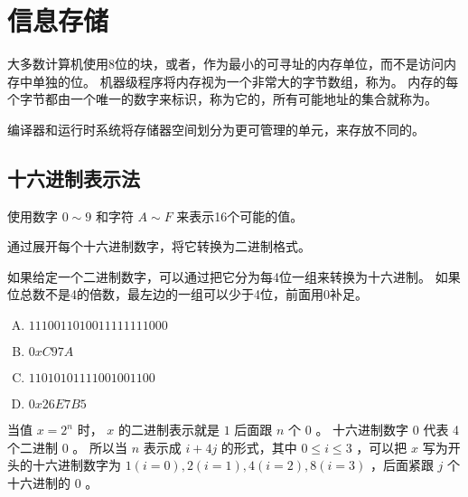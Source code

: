 
\section{信息存储}
{
    大多数计算机使用8位的块，或者，作为最小的可寻址的内存单位，而不是访问内存中单独的位。
    机器级程序将内存视为一个非常大的字节数组，称为。
    内存的每个字节都由一个唯一的数字来标识，称为它的，所有可能地址的集合就称为。

    编译器和运行时系统将存储器空间划分为更可管理的单元，来存放不同的。

    \subsection{十六进制表示法}
    {
        使用数字 $0 \sim 9$ 和字符 $A \sim F$ 来表示16个可能的值。

        通过展开每个十六进制数字，将它转换为二进制格式。

        如果给定一个二进制数字，可以通过把它分为每4位一组来转换为十六进制。
        如果位总数不是4的倍数，最左边的一组可以少于4位，前面用0补足。

        \begin{practicec}
            \begin{enumerate}[A.]
                \item $11 1001 1010 0111 1111 1000$
                \item $0xC97A$
                \item $1101 0101 1110 0100 1100$
                \item $0x26E7B5$
            \end{enumerate}
        \end{practicec}

        当值 $x = 2^n$ 时， $x$ 的二进制表示就是 $1$ 后面跟 $n$ 个 $0$ 。
        十六进制数字 $0$ 代表 4个二进制 $0$ 。
        所以当 $n$ 表示成 $i + 4j$ 的形式，其中 $0 \leq i \leq 3$ ，可以把 $x$ 写为开头的十六进制数字为 $1(i = 0), 2(i = 1), 4(i = 2), 8(i = 3)$ ，后面紧跟 $j$ 个十六进制的 $0$ 。

}}
